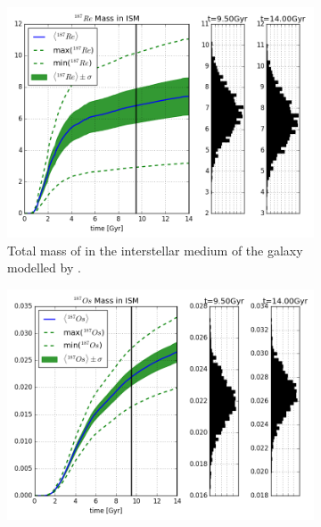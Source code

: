 \begin{figure}
  \centering
  \begin{subfigure}{\subfigwidth}
    \includegraphics[width=\linewidth]{results/MCExperiment_revised_2/combined_plot_Re-187.png}
    \caption{\label{fig:MCExperiment-nodecay-re187}
      Total mass of  in the interstellar medium of the galaxy modelled by \omegamodel.
  }
  \end{subfigure}
  \begin{subfigure}{\subfigwidth}
    \centering
    \includegraphics[width=\linewidth]{results/MCExperiment_revised_2/combined_plot_Os-187.png}
    \caption{\label{fig:MCExperiment-nodecay-os187}
}
\end{subfigure}
\end{figure}
